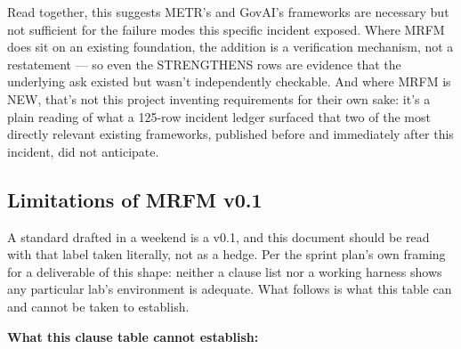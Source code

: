 Read together, this suggests METR's and GovAI's frameworks are necessary but not sufficient for the failure modes this specific incident exposed. Where MRFM does sit on an existing foundation, the addition is a verification mechanism, not a restatement --- so even the STRENGTHENS rows are evidence that the underlying ask existed but wasn't independently checkable. And where MRFM is NEW, that's not this project inventing requirements for their own sake: it's a plain reading of what a 125-row incident ledger surfaced that two of the most directly relevant existing frameworks, published before and immediately after this incident, did not anticipate.

\subsection*{Limitations of MRFM v0.1}
A standard drafted in a weekend is a v0.1, and this document should be read with that label taken literally, not as a hedge. Per the sprint plan's own framing for a deliverable of this shape: neither a clause list nor a working harness shows any particular lab's environment is adequate. What follows is what this table can and cannot be taken to establish.

\textbf{What this clause table cannot establish:}

